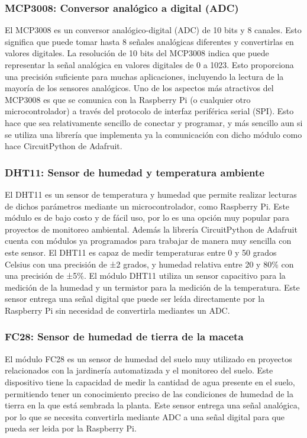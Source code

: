        \subsubsection{MCP3008: Conversor analógico a digital (ADC)}
        El MCP3008 \cite{wiki:mcp3008} es un conversor analógico-digital (ADC) de 10 bits y 8 canales. Esto significa que puede tomar hasta 8 señales analógicas diferentes y convertirlas en valores digitales.
        La resolución de 10 bits del MCP3008 indica que puede representar la señal analógica en valores digitales de 0 a 1023. Esto proporciona una precisión suficiente para muchas aplicaciones, incluyendo la lectura de la mayoría de los sensores analógicos.
        Uno de los aspectos más atractivos del MCP3008 es que se comunica con la Raspberry Pi (o cualquier otro microcontrolador) a través del protocolo de interfaz periférica serial (SPI). Esto hace que sea relativamente sencillo de conectar y programar, y más sencillo aun si se utiliza una librería que implementa ya la comunicación con dicho módulo como hace CircuitPython de Adafruit. \cite{doc:mcp3008}
        
        \subsubsection{DHT11: Sensor de humedad y temperatura ambiente}
        El DHT11 \cite{wiki:dht11} es un sensor de temperatura y humedad que permite realizar lecturas de dichos parámetros mediante un microcontrolador, como Raspberry Pi. Este módulo es de bajo costo y de fácil uso, por lo es  una opción muy popular para proyectos de monitoreo ambiental. Además la librería CircuitPython de Adafruit \cite{doc:mcp3008} cuenta con módulos ya programados para trabajar de manera muy sencilla con este sensor.
        El DHT11 es capaz de medir temperaturas entre 0 y 50 grados Celsius con una precisión de ±2 grados, y humedad relativa entre 20 y 80\% con una precisión de ±5\%.
        El módulo DHT11 utiliza un sensor capacitivo para la medición de la humedad y un termistor para la medición de la temperatura. Este sensor entrega una señal digital que puede ser leída directamente por la Raspberry Pi sin necesidad de convertirla mediantes un ADC.
        
        \subsubsection{FC28: Sensor de humedad de tierra de la maceta}
        El módulo FC28 es un sensor de humedad del suelo muy utilizado en proyectos relacionados con la jardinería automatizada y el monitoreo del suelo. Este dispositivo tiene la capacidad de medir la cantidad de agua presente en el suelo, permitiendo tener un conocimiento preciso de las condiciones de humedad de la tierra en la que está sembrada la planta. Este sensor entrega una señal analógica, por lo que se necesita convertirla mediante ADC a una señal digital para que pueda ser leida por la Raspberry Pi.
        
